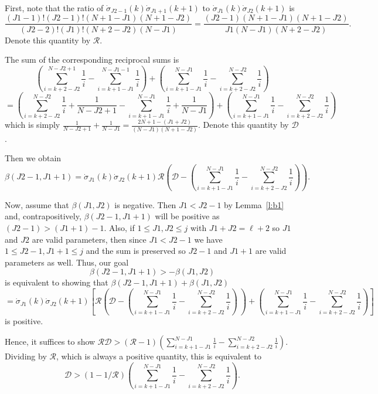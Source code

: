 \documentclass[11pt]{amsart}   %
\theoremstyle{definition}
\theoremstyle{remark}
\numberwithin{equation}{section}
\theoremstyle{theorem}
\begin{document}
First, note that the ratio of $\dot\sigma_{J2-1}(k) \dot\sigma_{J1+1}(k+1)$ to $\dot\sigma_{J1}(k) \dot\sigma_{J2}(k+1)$ is
\[ \frac{(J1-1)! (J2-1)! (N+1-J1)(N+1-J2)}{(J2-2)!(J1)! (N+2-J2)(N-J1)} = \frac{(J2-1)(N+1-J1)(N+1-J2)}{J1 (N-J1)(N+2-J2)}. \]
Denote this quantity by $\mathcal{R}$.

The sum of the corresponding reciprocal sums is
    \[ \left( \sum_{i=k+2-J2}^{N-J2+1} \frac{1}{i} - \sum_{i=k+1-J1}^{N-J1-1} \frac{1}{i} \right) + \left( \sum_{i=k+1-J1}^{N-J1} \frac{1}{i} - \sum_{i=k+2-J2}^{N-J2} \frac{1}{i} \right) \]
    \[ = \left( \sum_{i=k+2-J2}^{N-J2} \frac{1}{i} + \frac{1}{N-J2+1} - \sum_{i=k+1-J1}^{N-J1} \frac{1}{i} + \frac{1}{N-J1} \right) + \left( \sum_{i=k+1-J1}^{N-J1} \frac{1}{i} - \sum_{i=k+2-J2}^{N-J2} \frac{1}{i} \right) \]
which is simply $\frac{1}{N-J2+1} + \frac{1}{N-J1} = \frac{2N+1-(J1+J2)}{(N-J1)(N+1-J2)}$.  Denote this quantity by $\mathcal{D}$.  
    
Then we obtain
\[ \beta(J2-1,J1+1) = \dot\sigma_{J1}(k) \dot\sigma_{J2}(k+1) \mathcal{R} \left(\mathcal{D} - \left( \sum_{i=k+1-J1}^{N-J1} \frac{1}{i} - \sum_{i=k+2-J2}^{N-J2} \frac{1}{i} \right) \right). \]


Now, assume that $\beta(J1,J2)$ is negative.  Then $J1 < J2-1$ by Lemma~\ref{l:b1} and, contrapositively, $\beta(J2-1, J1+1)$ will be positive as $(J2-1) > (J1+1)-1$.  Also, if $1 \leq J1, J2 \leq j$ with $J1 + J2 = \ell+2$ so $J1$ and $J2$ are valid parameters, then since $J1 < J2-1$ we have $1 \leq J2-1, J1+1 \leq j$ and the sum is preserved so $J2-1$ and $J1+1$ are valid parameters as well.  Thus, our goal
\[ \beta(J2-1,J1+1) > -\beta(J1,J2) \]
is equivalent to showing that $\beta(J2-1,J1+1) + \beta(J1,J2)$ 
\[ = \dot\sigma_{J1}(k) \dot\sigma_{J2}(k+1) \left[ \mathcal{R} \left(\mathcal{D} - \left( \sum_{i=k+1-J1}^{N-J1} \frac{1}{i} - \sum_{i=k+2-J2}^{N-J2} \frac{1}{i} \right)\ \right) + \left(\sum_{i=k+1-J1}^{N-J1} \frac{1}{i} - \sum_{i=k+2-J2}^{N-J2} \frac{1}{i}\right) \right]   \]
is positive.

Hence, it suffices to show $\mathcal{R} \mathcal{D} > (\mathcal{R} - 1) \left( \sum_{i=k+1-J1}^{N-J1} \frac{1}{i} - \sum_{i=k+2-J2}^{N-J2} \frac{1}{i} \right)$.  Dividing by $\mathcal{R}$, which is always a positive quantity, this is equivalent to 
\begin{equation}\label{e:tk}
\mathcal{D} > (1 - 1/\mathcal{R}) \left( \sum_{i=k+1-J1}^{N-J1} \frac{1}{i} - \sum_{i=k+2-J2}^{N-J2} \frac{1}{i} \right). 
\end{equation}
\end{document}
